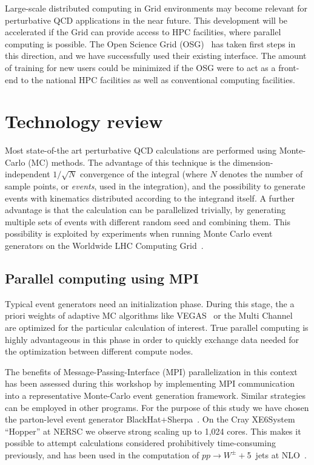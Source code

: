 Large-scale distributed computing in Grid environments 
may become relevant for perturbative QCD applications 
in the near future. This development will be accelerated if the Grid
can provide access to HPC facilities, where parallel 
computing is possible. The Open Science Grid (OSG)~\cite{OSG} has taken 
first steps in this direction, and we have successfully used their
existing interface. The amount of training for new users could be minimized
if the OSG were to act as a front-end to the national HPC facilities
as well as conventional computing facilities.

\section{Technology review}
Most state-of-the art perturbative QCD calculations are performed
using Monte-Carlo (MC) methods. The advantage of this technique
is the dimension-independent $1/\sqrt{N}$ convergence of the integral
(where $N$ denotes the number of sample points, or \textit{events}, 
used in the integration), and the possibility to generate events
with kinematics distributed according to the integrand
itself. A further advantage is that the calculation can be
parallelized trivially, by generating multiple sets of events with
different random seed and combining them. This possibility is
exploited by experiments when running Monte Carlo event generators on
the Worldwide LHC Computing Grid~\cite{WLCG}. 

\subsection{Parallel computing using MPI}
Typical event generators need an initialization phase. During this
stage, the a priori weights of adaptive MC algorithms like
VEGAS~\cite{Lepage:1977sw} or the Multi Channel~\cite{Kleiss:1994qy}
are optimized for the particular calculation of interest. True
parallel computing is highly advantageous in this phase in order to
quickly exchange data needed for the optimization between different
compute nodes.

The benefits of Message-Passing-Interface (MPI) parallelization
in this context has been assessed during this workshop by implementing
MPI communication into a representative Monte-Carlo event generation
framework. Similar strategies can be employed in other programs.  For
the purpose of this study we have chosen the parton-level event generator
BlackHat+Sherpa~\cite{Berger:2008sj,Gleisberg:2003xi,Gleisberg:2008ta}.
On the Cray XE6\trademark System ``Hopper'' at NERSC we observe 
strong scaling up to 1,024 cores. This makes it possible to attempt
calculations considered prohibitively time-consuming previously, 
and has been used in the computation of $pp\to W^\pm+$5~jets 
at NLO~\cite{Bern:2013gka}.

